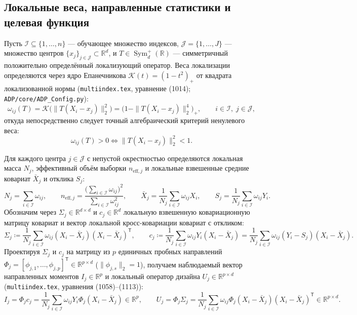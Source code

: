 \documentclass[11pt,a4paper]{article}
\newcommand{\R}{\mathbb{R}}
\newcommand{\T}{^{\mathsf{T}}}
\newcommand{\Kern}{\mathcal{K}}
\newcommand{\TEDR}{T}
\newcommand{\II}{\mathcal{I}}
\newcommand{\JJJ}{\mathcal{J}}
\theoremstyle{definition}
\theoremstyle{remark}
\begin{document}
\subsection{Локальные веса, направленные статистики и целевая функция}

Пусть $\II \subseteq \{1, \ldots, n\}$ --- обучающее множество индексов, $\JJJ = \{1, \ldots, J\}$ --- множество центров $\{x_j\}_{j \in \JJJ} \subset \R^d$, и $\TEDR \in \operatorname{Sym}_d^+(\R)$ --- симметричный положительно определённый локализующий оператор. Веса локализации определяются через ядро Епанечникова $\Kern(t) = (1 - t^2)_+$ от квадрата локализованной нормы (\texttt{multiindex.tex}, уравнение (1014); \texttt{ADP/core/ADP\_Config.py}):
\begin{equation}\label{eq:weights_def}
    \omega_{ij}(\TEDR) = \Kern\bigl(\|\TEDR(X_i - x_j)\|_2^2\bigr) = \bigl(1 - \|\TEDR(X_i - x_j)\|_2^4\bigr)_+, \qquad i \in \II, \; j \in \JJJ,
\end{equation}
откуда непосредственно следует точный алгебраический критерий ненулевого веса:
\begin{equation}\label{eq:support_iff}
    \omega_{ij}(\TEDR) > 0 \iff \|\TEDR(X_i - x_j)\|_2^2 < 1.
\end{equation}

Для каждого центра $j \in \JJJ$ с непустой окрестностью определяются локальная масса $N_j$, эффективный объём выборки $n_{\mathrm{eff},j}$ и локальные взвешенные средние ковариат $\bar{X}_j$ и отклика $S_j$:
\begin{equation}\label{eq:local_mass_mean}
    N_j = \sum_{i \in \II} \omega_{ij}, \qquad n_{\mathrm{eff},j} = \frac{\bigl(\sum_{i \in \II} \omega_{ij}\bigr)^2}{\sum_{i \in \II} \omega_{ij}^2}, \qquad \bar{X}_j = \frac{1}{N_j}\sum_{i \in \II} \omega_{ij} X_i, \qquad S_j = \frac{1}{N_j}\sum_{i \in \II} \omega_{ij} Y_i.
\end{equation}
Обозначим через $\Sigma_j \in \R^{d \times d}$ и $c_j \in \R^d$ локальную взвешенную ковариационную матрицу ковариат и вектор локальной кросс-ковариации ковариат с откликом:
\begin{equation}\label{eq:sigma_c_local}
    \Sigma_j \coloneqq \frac{1}{N_j}\sum_{i \in \II} \omega_{ij}(X_i - \bar{X}_j)(X_i - \bar{X}_j)\T, \qquad c_j \coloneqq \frac{1}{N_j}\sum_{i \in \II} \omega_{ij} Y_i (X_i - \bar{X}_j) = \frac{1}{N_j}\sum_{i \in \II} \omega_{ij} (Y_i - S_j)(X_i - \bar{X}_j).
\end{equation}
Проектируя $\Sigma_j$ и $c_j$ на матрицу из $p$ единичных пробных направлений $\Phi_j = [\phi_{j,1}, \ldots, \phi_{j,p}]\T \in \R^{p \times d}$ ($\|\phi_{j,s}\|_2 = 1$), получаем наблюдаемый вектор направленных моментов $I_j \in \R^p$ и локальный оператор дизайна $U_j \in \R^{p \times d}$ (\texttt{multiindex.tex}, уравнения (1058)--(1113)):
\begin{equation}\label{eq:I_U_def}
    I_j = \Phi_j c_j = \frac{1}{N_j}\sum_{i \in \II} \omega_{ij} Y_i \Phi_j(X_i - \bar{X}_j) \in \R^p, \qquad U_j = \Phi_j \Sigma_j = \frac{1}{N_j}\sum_{i \in \II} \omega_{ij} \Phi_j(X_i - \bar{X}_j)(X_i - \bar{X}_j)\T \in \R^{p \times d}.
\end{equation}
\end{document}
